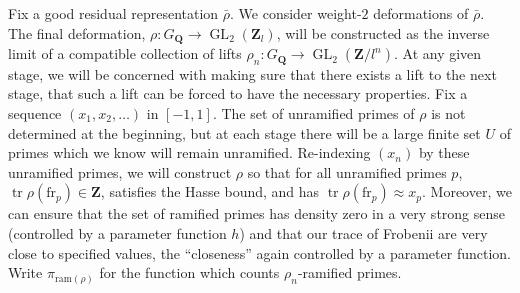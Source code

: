 \documentclass{article}
\DeclareMathOperator{\GL}{GL}
\DeclareMathOperator{\tr}{tr}
\newcommand{\bQ}{\mathbf{Q}}
\newcommand{\bZ}{\mathbf{Z}}
\newcommand{\frob}{\mathrm{fr}}
\newcommand{\ram}{\mathrm{ram}}
\begin{document}
Fix a good residual representation $\bar\rho$. We 
consider weight-$2$ deformations of $\bar\rho$. The final deformation, 
$\rho\colon G_\bQ \to \GL_2(\bZ_l)$, will be constructed as the inverse limit 
of a compatible collection of lifts $\rho_n\colon G_\bQ \to \GL_2(\bZ/l^n)$. At 
any given stage, we will be concerned with making sure that there exists a 
lift to the next stage, that such a lift can be forced to have the necessary 
properties. Fix a sequence $(x_1,x_2,\dots)$ in $[-1,1]$. The set of unramified 
primes of $\rho$ is not determined at the beginning, but at each stage there 
will be a large finite set $U$ of primes which we know will remain unramified. 
Re-indexing $(x_n)$ by these unramified primes, we will construct $\rho$ so that 
for all unramified primes $p$, $\tr\rho(\frob_p)\in \bZ$, satisfies the Hasse 
bound, and has $\tr\rho(\frob_p) \approx x_p$. Moreover, we can ensure that the 
set of ramified primes has density zero in a very strong sense (controlled by a 
parameter function $h$) and that our trace of Frobenii are very close to 
specified values, the ``closeness'' again controlled by a parameter function.
Write $\pi_{\ram(\rho)}$ for the function which counts $\rho_n$-ramified 
primes. 
\end{document}
